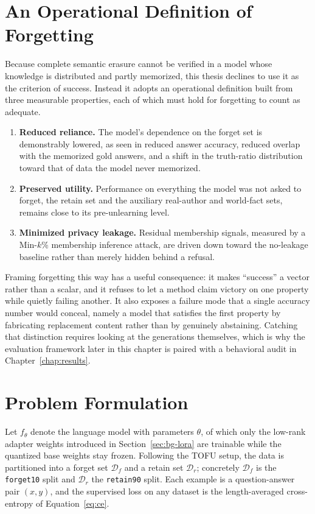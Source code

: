 \documentclass[a4paper,12pt]{report}
\begin{document}
\section{An Operational Definition of Forgetting}
Because complete semantic erasure cannot be verified in a model whose knowledge is distributed and partly memorized, this thesis declines to use it as the criterion of success. Instead it adopts an operational definition built from three measurable properties, each of which must hold for forgetting to count as adequate.

\begin{enumerate}
	\item \textbf{Reduced reliance.} The model's dependence on the forget set is demonstrably lowered, as seen in reduced answer accuracy, reduced overlap with the memorized gold answers, and a shift in the truth-ratio distribution toward that of data the model never memorized.
	\item \textbf{Preserved utility.} Performance on everything the model was not asked to forget, the retain set and the auxiliary real-author and world-fact sets, remains close to its pre-unlearning level.
	\item \textbf{Minimized privacy leakage.} Residual membership signals, measured by a Min-$k$\% membership inference attack, are driven down toward the no-leakage baseline rather than merely hidden behind a refusal.
\end{enumerate}

Framing forgetting this way has a useful consequence: it makes ``success'' a vector rather than a scalar, and it refuses to let a method claim victory on one property while quietly failing another. It also exposes a failure mode that a single accuracy number would conceal, namely a model that satisfies the first property by fabricating replacement content rather than by genuinely abstaining. Catching that distinction requires looking at the generations themselves, which is why the evaluation framework later in this chapter is paired with a behavioral audit in Chapter~\ref{chap:results}.

\section{Problem Formulation}
Let $f_\theta$ denote the language model with parameters $\theta$, of which only the low-rank adapter weights introduced in Section~\ref{sec:bg-lora} are trainable while the quantized base weights stay frozen. Following the TOFU setup, the data is partitioned into a forget set $\mathcal{D}_f$ and a retain set $\mathcal{D}_r$; concretely $\mathcal{D}_f$ is the \texttt{forget10} split and $\mathcal{D}_r$ the \texttt{retain90} split. Each example is a question-answer pair $(x, y)$, and the supervised loss on any dataset is the length-averaged cross-entropy of Equation~\eqref{eq:ce}.
\end{document}
